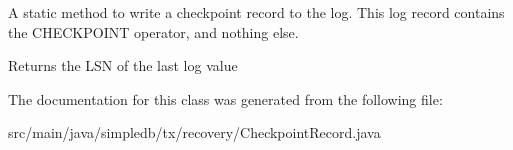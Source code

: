 A static method to write a checkpoint record to the log. This log record contains the C\+H\+E\+C\+K\+P\+O\+I\+NT operator, and nothing else. \begin{DoxyReturn}{Returns}
the L\+SN of the last log value 
\end{DoxyReturn}


The documentation for this class was generated from the following file\+:\begin{DoxyCompactItemize}
\item 
src/main/java/simpledb/tx/recovery/Checkpoint\+Record.\+java\end{DoxyCompactItemize}
